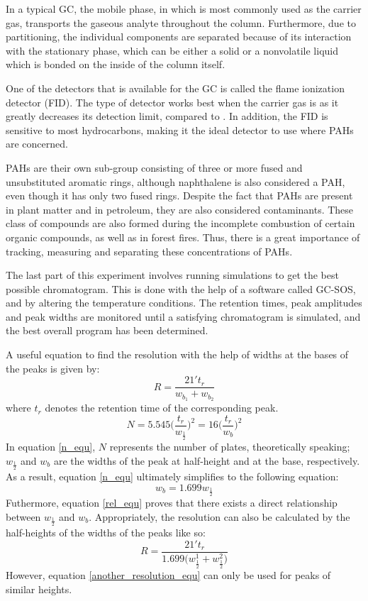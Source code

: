 \documentclass[a4paper, 12pt]{article}
\begin{document}
In a typical GC, the mobile phase, in which  is most commonly used as the carrier gas, transports the gaseous analyte throughout the column. Furthermore, due to partitioning, the individual components are separated because of its interaction with the stationary phase, which can be either a solid or a nonvolatile liquid which is bonded on the inside of the column itself.

One of the detectors that is available for the GC is called the flame ionization detector (FID). The type of detector works best when the carrier gas is  as it greatly decreases its detection limit, compared to . In addition, the FID is sensitive to most hydrocarbons, making it the ideal detector to use where PAHs are concerned.

PAHs are their own sub-group consisting of three or more fused and unsubstituted aromatic rings, although naphthalene is also considered a PAH, even though it has only two fused rings. Despite the fact that PAHs are present in plant matter and in petroleum, they are also considered contaminants. These class of compounds are also formed during the incomplete combustion of certain organic compounds, as well as in forest fires. Thus, there is a great importance of tracking, measuring and separating these concentrations of PAHs.

The last part of this experiment involves running simulations to get the best possible chromatogram. This is done with the help of a software called GC-SOS\textsuperscript{\textregistered}, and by altering  the temperature conditions. The retention times, peak amplitudes and peak widths are monitored until a satisfying chromatogram is simulated, and the best overall program has been determined.

A useful equation to find the resolution with the help of widths at the bases of the peaks is given by:
\begin{equation} \label{resolution_equ}
    R = \frac{21't_r}{w_{b_1} + w_{b_2}}
\end{equation}
where \(t_r\) denotes the retention time of the corresponding peak.
\begin{equation} \label{n_equ}
    N = 5.545\Bigg(\frac{t_r}{w_\frac{1}{2}}\Bigg)^2 = 16\Bigg(\frac{t_r}{w_b}\Bigg)^2
\end{equation}
In equation \ref{n_equ}, \(N\) represents the number of plates, theoretically speaking; \(w_\frac{1}{2}\) and \(w_b\) are the widths of the peak at half-height and at the base, respectively. As a result, equation \ref{n_equ} ultimately simplifies to the following equation:
\begin{equation} \label{rel_equ}
    w_b = 1.699w_\frac{1}{2}
\end{equation}
Futhermore, equation \ref{rel_equ} proves that there exists a direct relationship between \(w_\frac{1}{2}\) and \(w_b\). Appropriately, the resolution can also be calculated by the half-heights of the widths of the peaks like so:
\begin{equation} \label{another_resolution_equ}
    R = \frac{21't_r}{1.699\Big(w_{\frac{1}{2}}^1 + w_{\frac{1}{2}}^2\Big)}
\end{equation}
However, equation \ref{another_resolution_equ} can only be used for peaks of similar heights.
\end{document}
